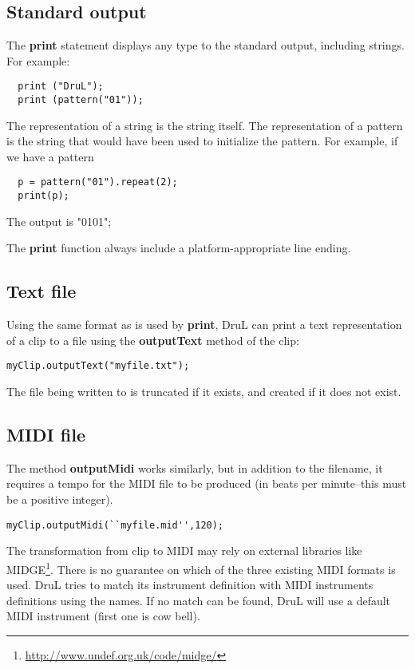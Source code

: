 \subsection{Standard output}

The \textbf{print} statement displays any type to the standard
output, including strings. For example:
\begin{verbatim}
  print ("DruL");
  print (pattern("01"));
\end{verbatim}

The representation of a string is the string itself. The representation
of a pattern is the string that would have been used to initialize
the pattern. For example, if we have a pattern
\begin{verbatim}
  p = pattern("01").repeat(2);
  print(p);
\end{verbatim}
The output is "0101";

The \textbf{print} function always include a platform-appropriate line
ending.

\subsection{Text file}

Using the same format as is used by \textbf{print}, DruL can print a text representation of a clip to a file
using the \textbf{outputText} method of the clip:

\begin{verbatim}
myClip.outputText("myfile.txt");
\end{verbatim}

The file being written to is truncated if it exists, and created if it does not exist.

\subsection{MIDI file}

The method \textbf{outputMidi} works similarly, but in addition to the filename, it requires a tempo for the MIDI file to be produced (in beats per minute--this must be a positive integer).

\begin{verbatim}
myClip.outputMidi(``myfile.mid'',120);
\end{verbatim}

The transformation from clip to MIDI may rely
on external libraries like MIDGE\footnote{\url{http://www.undef.org.uk/code/midge/}}. There is no guarantee on which of the three existing MIDI formats is used.
DruL tries to match its instrument definition with MIDI instruments definitions
using the names. If no match can be found, DruL will use a default MIDI instrument (first one is cow bell).


